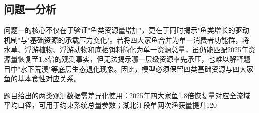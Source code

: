 \subsection{问题一分析}
问题一的核心不仅在于验证"鱼类资源量增加"，更在于同时揭示"鱼类增长的驱动机制"与"基础资源的承载压力变化"。若将四大家鱼合并为单一消费者功能群，将水草、浮游植物、浮游动物和底栖饵料简化为单一资源总量，虽仍能匹配2025年资源量恢复至1.8倍的观测事实，但无法揭示哪一层级资源率先承压，也难以解释题目中"水下荒漠"等底层生态退化现象。因此，模型必须保留四类基础资源与四大家鱼的基本食性对应关系。

题目给出的两类观测数据需差异化使用：2025年四大家鱼1.8倍恢复量对应全流域平均口径，可用于约束系统总量参数；湖北江段单网次渔获量提升120%

